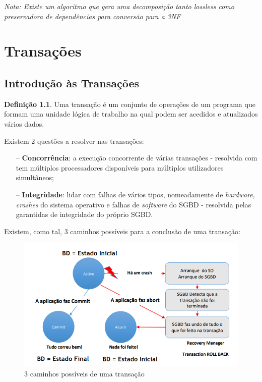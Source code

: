 \documentclass[oneside]{book}
\theoremstyle{definition}
\newtheorem{definition}{Definição}
\begin{document}
 \textit{Nota: Existe um algoritmo que gera uma decomposição tanto lossless como preservadora de dependências para conversão para a 3NF}












\chapter{Transações}
\section{Introdução às Transações}
\begin{definition}
    Uma transação é um conjunto de operações de um programa que formam uma unidade lógica de trabalho na qual podem ser acedidos e atualizados vários dados.
\end{definition}
Existem 2 questões a resolver nas transações:
\begin{itemize}
    \itemsep0cm
    \item[--] \textbf{Concorrência}: a execução concorrente de várias transações - resolvida com tem múltiplos processadores disponíveis para múltiplos utilizadores simultâneos;
    \item[--] \textbf{Integridade}: lidar com falhas de vários tipos, nomeadamente de \textit{hardware}, \textit{crashes} do sistema operativo e falhas de \textit{software} do SGBD - resolvida pelas garantidas de integridade do próprio SGBD.
\end{itemize}

Existem, como tal, 3 caminhos possíveis para a conclusão de uma transação:
\begin{figure}[H]
    \centering
    \includegraphics[scale = 0.4]{cap3/caminhos_transacoes.png}
    \caption{3 caminhos possíveis de uma transação}
\end{figure}
\end{document}
